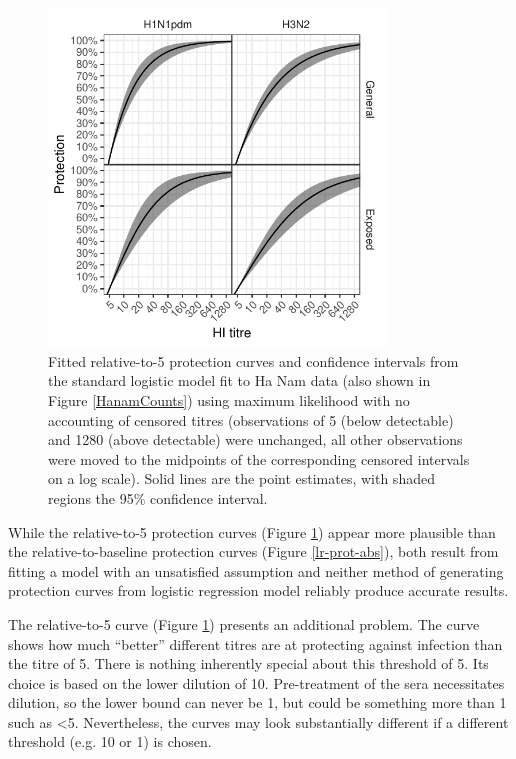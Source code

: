 \documentclass[12pt]{article}
\begin{document}
\pagebreak

\begin{figure}[htp]
	\centering
	\includegraphics[width=0.8\textwidth]{../fit-logistic-boot-plot/hanam-hi-prot-rel.pdf}
	\caption{
	Fitted relative-to-5 protection curves and confidence intervals from the standard logistic model fit to Ha Nam data (also shown in Figure \ref{HanamCounts}) using maximum likelihood with no accounting of censored titres (observations of 5 (below detectable) and 1280 (above detectable) were unchanged, all other observations were moved to the midpoints of the corresponding censored intervals on a log scale). Solid lines are the point estimates, with shaded regions the 95\% confidence interval.
	}
	\label{lr-prot-rel}
\end{figure}

While the relative-to-5 protection curves (Figure \ref{lr-prot-rel}) appear more plausible than the relative-to-baseline protection curves (Figure \ref{lr-prot-abs}), both result from fitting a model with an unsatisfied assumption and neither method of generating protection curves from logistic regression model reliably produce accurate results.

The relative-to-5 curve (Figure \ref{lr-prot-rel}) presents an additional problem. The curve shows how much ``better'' different titres are at protecting against infection than the titre of 5. 
There is nothing inherently special about this threshold of 5. Its choice is based on the lower dilution of 10. Pre-treatment of the sera necessitates dilution, so the lower bound can never be 1, but could be something more than 1 such as <5.  Nevertheless, the curves may look substantially different if a different threshold (e.g. 10 or 1) is chosen.
\end{document}
